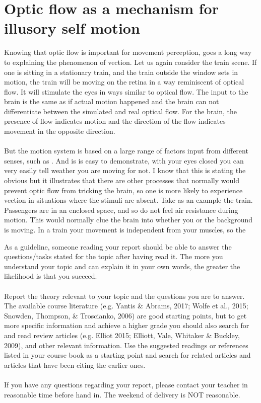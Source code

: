 \documentclass[11pt,a4paper,oneside,table,xcdraw]{article}
\begin{document}
\section{Optic flow as a mechanism for illusory self motion}
Knowing that optic flow is important for movement perception, goes a long way to explaining the phenomenon of vection. Let us again consider the train scene. If one is sitting in a stationary train, and the train outside the window sets in motion, the train will be moving on the retina in a way reminiscent of optical flow. It will stimulate the eyes in ways similar to optical flow. The input to the brain is the same as if actual motion happened and the brain can not differentiate between the simulated and real optical flow. For the brain, the presence of flow indicates motion and the direction of the flow indicates movement in the opposite direction.\\\\
But the motion system is based on a large range of factors input from different senses, such as . And is is easy to demonstrate, with your eyes closed you can very easily tell weather you are moving for not. I know that this is stating the obvious but it illustrates that there are other processes that normally would prevent optic flow from tricking the brain, so one is more likely to experience vection in situations where the stimuli are absent. Take as an example the train. Passengers are in an enclosed space, and so do not feel air resistance during motion. This would normally clue the brain into whether you or the background is moving. In a train your movement is independent from your muscles, so the  




\iffalse
	As a guideline, someone reading your report should be able to answer the questions/tasks stated for the topic after having read it. The more you understand your topic and can explain it in your own words, the greater the likelihood is that you succeed.\\\\
	Report the theory relevant to your topic and the questions you are to answer. The available course literature (e.g. Yantis \& Abrams, 2017; Wolfe et al., 2015; Snowden, Thompson, \& Troscianko, 2006) are good starting points, but to get more specific information and achieve a higher grade you should also search for and read review articles (e.g. Elliot 2015; Elliott, Vale, Whitaker \& Buckley, 2009), and other relevant information. Use the suggested readings or references listed in your course book as a starting point and search for related articles and articles that have been citing the earlier ones.\\\\
	If you have any questions regarding your report, please contact your teacher in reasonable time before hand in. The weekend of delivery is NOT reasonable.
\end{document}
